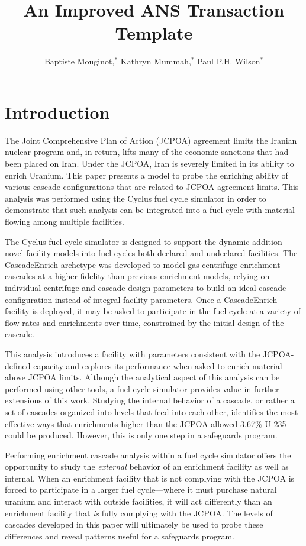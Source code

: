 \documentclass{anstrans}
\title{An Improved ANS Transaction Template}
\author{Baptiste Mouginot,$^{*}$ Kathryn Mummah,$^{*}$ Paul P.H. Wilson$^{*}$}
\institute{
$^{*}$University of Wisconsin-Madison, WI
}
\begin{document}
\section{Introduction}

The Joint Comprehensive Plan of Action (JCPOA)\cite{ref} %
agreement limits the Iranian nuclear program and, in return, lifts many of the economic sanctions that had been placed on Iran. Under the JCPOA, Iran is severely limited in its ability to enrich Uranium. This paper presents a model to probe the enriching ability of various cascade configurations that are related to JCPOA agreement limits. This analysis was performed using the Cyclus fuel cycle simulator\cite{ref} %
in order to demonstrate that such analysis can be integrated into a fuel cycle with material flowing among multiple facilities.

The Cyclus fuel cycle simulator is designed to support the dynamic addition novel facility models into fuel cycles both declared and undeclared facilities. The CascadeEnrich archetype\cite{ref} was developed to model gas centrifuge enrichment cascades at a higher fidelity than previous enrichment models, relying on individual centrifuge and cascade design parameters to build an ideal cascade configuration instead of integral facility parameters. Once a CascadeEnrich facility is deployed, it may be asked to participate in the fuel cycle at a variety of flow rates and enrichments over time, constrained by the initial design of the cascade.

This analysis introduces a facility with parameters consistent with the JCPOA-defined capacity and explores its performance when asked to enrich material above JCPOA limits. Although the analytical aspect of this analysis can be performed using other tools, a fuel cycle simulator provides value in further extensions of this work. Studying the internal behavior of a cascade, or rather a set of cascades organized into levels that feed into each other, identifies the most effective ways that enrichments higher than the JCPOA-allowed 3.67\% U-235 could be produced. However, this is only one step in a safeguards program.

Performing enrichment cascade analysis within a fuel cycle simulator offers the opportunity to study the \textit{external} behavior of an enrichment facility as well as internal. When an enrichment facility that is not complying with the JCPOA is forced to participate in a larger fuel cycle---where it must purchase natural uranium and interact with outside facilities, it will act differently than an enrichment facility that \textit{is} fully complying with the JCPOA. The levels of cascades developed in this paper will ultimately be used to probe these differences and reveal patterns useful for a safeguards program.
\end{document}
